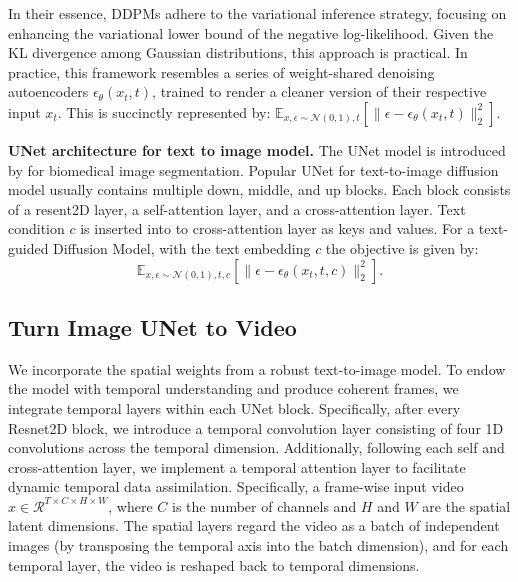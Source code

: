 \documentclass{article} \usepackage{iclr2024_conference,times}
\begin{document}
In their essence, DDPMs adhere to the variational inference strategy, focusing on enhancing the variational lower bound of the negative log-likelihood. Given the KL divergence among Gaussian distributions, this approach is practical. In practice, this framework resembles a series of weight-shared denoising autoencoders $\epsilon_\theta(x_t, t)$, trained to render a cleaner version of their respective input $x_t$. This is succinctly represented by: $\mathbb{E}_{x, \epsilon \sim \mathcal{N}(0, 1), t} \left[ \| \epsilon - \epsilon_\theta(x_t, t) \|^2_2 \right].$

\noindent\textbf{UNet architecture for text to image model.}
The UNet model is introduced by \citep{2015u} for biomedical image segmentation. Popular UNet for text-to-image diffusion model usually contains multiple down, middle, and up blocks. Each block consists of a resent2D layer, a self-attention layer, and a cross-attention layer. Text condition $c$ is inserted into to cross-attention layer as keys and values. For a text-guided Diffusion Model, with the text embedding  $c $ the objective is given by:
\begin{equation}
\mathbb{E}_{x, \epsilon \sim \mathcal{N}(0, 1), t, c} \left[ \| \epsilon - \epsilon_\theta(x_t, t, c) \|^2_2 \right].
\label{objective}
\end{equation}





\subsection{Turn Image UNet to Video} We incorporate the spatial weights from a robust text-to-image model. To endow the model with temporal understanding and produce coherent frames, we integrate temporal layers within each UNet block. Specifically, after every Resnet2D block, we introduce a temporal convolution layer consisting of four 1D convolutions across the temporal dimension. Additionally, following each self and cross-attention layer, we implement a temporal attention layer to facilitate dynamic temporal data assimilation. 
Specifically, a frame-wise input video $x \in \mathcal{R}^{T \times C \times H \times W}$,
where $C$ is the number of  channels and $H$ and $W$ are the spatial latent dimensions.
The spatial layers regard the video as a batch of independent images (by transposing the temporal axis into the batch dimension), and for each temporal layer, the video is reshaped back to temporal dimensions.
\end{document}
